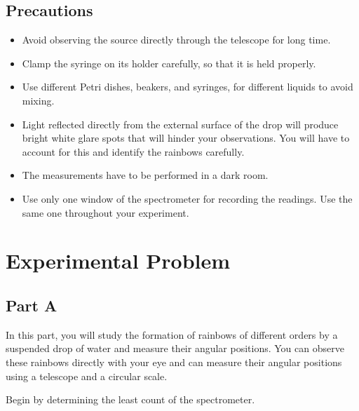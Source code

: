\subsection*{Precautions}
\begin{itemize}
\item Avoid observing the source directly through the telescope for long time.
\item Clamp the syringe on its holder carefully, so that it is held properly.
\item Use different Petri dishes, beakers, and syringes, for different liquids to avoid mixing.
\item Light reflected directly from the external surface of the drop will produce bright white glare spots that will hinder your observations. You will have to account for this and identify the rainbows carefully. 
\item The measurements have to be performed in a dark room.
\item Use only one window of the spectrometer for recording the readings. Use the same one throughout your experiment.
\end{itemize}


\section*{Experimental Problem}
\subsection*{Part A}

In this part, you will study the formation of rainbows of different orders by a suspended drop of water and measure their angular positions. You can observe these rainbows directly with your eye and can measure their angular positions using a telescope and a circular scale. 

\begin{imp}
Begin by determining the least count of the spectrometer.
\end{imp}

